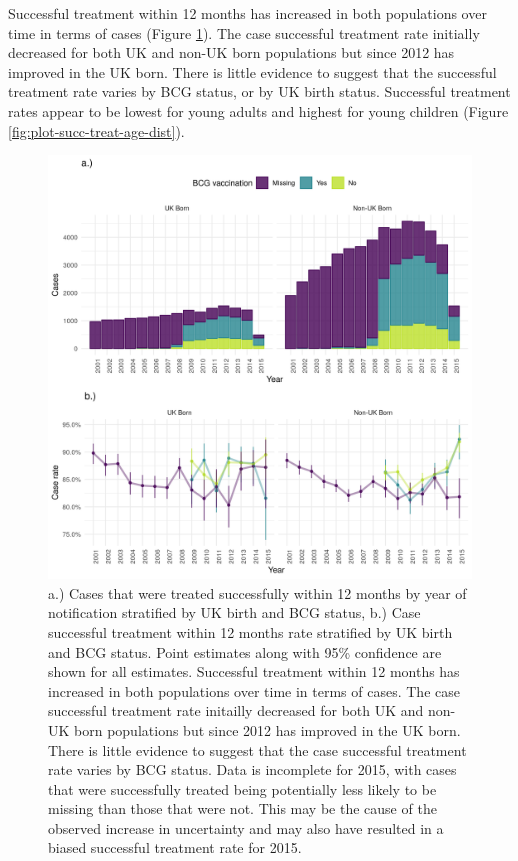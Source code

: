 \documentclass[11pt,twoside]{bristolthesis}
\begin{document}
  Successful treatment within 12 months has increased in both populations over time in terms of cases (Figure \ref{fig:plot-succ-treat-case-rate}). The case successful treatment rate initially decreased for both UK and non-UK born populations but since 2012 has improved in the UK born. There is little evidence to suggest that the successful treatment rate varies by BCG status, or by UK birth status. Successful treatment rates appear to be lowest for young adults and highest for young children (Figure \ref{fig:plot-succ-treat-age-dist}).
  \begin{figure}
  
  {\centering \includegraphics[width=0.8\linewidth,]{chapters/tb-epi-england/figures/plot-succ-treat-case-rate} 
  
  }
  
  \caption[a.) Cases that were treated successfully within 12 months by year of notification stratified by UK birth and BCG status, b.) Case successful treatment within 12 months rate stratified by UK birth and BCG status.]{a.) Cases that were treated successfully within 12 months by year of notification stratified by UK birth and BCG status, b.) Case successful treatment within 12 months rate stratified by UK birth and BCG status. Point estimates along with 95\% confidence are shown for all estimates. Successful treatment within 12 months has increased in both populations over time in terms of cases. The case successful treatment rate initailly decreased for both UK and non-UK born populations but since 2012 has improved in the UK born. There is little evidence to suggest that the case successful treatment rate varies by BCG status. Data is incomplete for 2015, with cases that were successfully treated being potentially less likely to be missing than those that were not. This may be the cause of the observed increase in uncertainty and may also have resulted in a biased successful treatment rate for 2015.}\label{fig:plot-succ-treat-case-rate}
  \end{figure}
\end{document}
